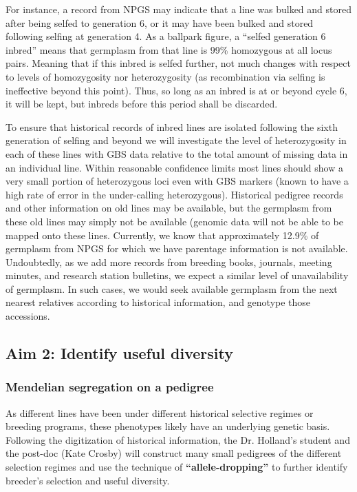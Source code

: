 \documentclass[12pt]{article}
\begin{document}
For instance, a record from NPGS may indicate that a line was bulked and stored after being selfed to generation 6, or it may have been bulked and stored following selfing at generation 4. As a ballpark figure, a ``selfed generation 6 inbred'' means that germplasm from that line is 99\% homozygous at all locus pairs. 
Meaning that if this inbred is selfed further, not much changes with respect to levels of homozygosity nor heterozygosity (as recombination via selfing is ineffective beyond this point).  
Thus, so long as an inbred is at or beyond cycle 6, it will be kept, but inbreds before this period shall be discarded.

To ensure that historical records of inbred lines are isolated following the sixth generation of selfing and beyond we will investigate the level of heterozygosity in each of these lines with GBS data relative to the total amount of missing data in an individual line. 
Within reasonable confidence limits most lines should show a very small portion of heterozygous loci even with GBS markers (known to have a high rate of error in the under-calling heterozygous). 
Historical pedigree records and other information on old lines may be available, but the germplasm from these old lines may simply not be available (genomic data will not be able to be mapped onto these lines. 
Currently, we know that approximately 12.9\% of germplasm from NPGS for which we have parentage information is not available. 
Undoubtedly, as we add more records from breeding books, journals, meeting minutes, and research station bulletins, we expect a similar level of unavailability of germplasm.  
In such cases, we would seek available germplasm from the next nearest relatives according to historical information, and genotype those accessions. 

\subsection*{Aim 2: Identify useful diversity}

\subsubsection*{Mendelian segregation on a pedigree}
As different lines have been under different historical selective regimes or breeding programs, these phenotypes likely have an underlying genetic basis. Following the digitization of historical information, the Dr. Holland's student and the post-doc (Kate Crosby) will construct many small pedigrees of the different selection regimes and use the technique of \textbf{``allele-dropping''} to further identify breeder's selection and useful diversity. 
\end{document}
